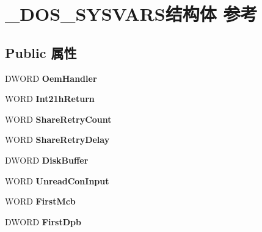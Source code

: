 \hypertarget{struct___d_o_s___s_y_s_v_a_r_s}{}\section{\+\_\+\+D\+O\+S\+\_\+\+S\+Y\+S\+V\+A\+R\+S结构体 参考}
\label{struct___d_o_s___s_y_s_v_a_r_s}
\subsection*{Public 属性}
\begin{DoxyCompactItemize}
\item 
\mbox{\label{struct___d_o_s___s_y_s_v_a_r_s_a5e091370267bb58497bc00f0b9d229a5}} 
D\+W\+O\+RD {\bfseries Oem\+Handler}
\item 
\mbox{\label{struct___d_o_s___s_y_s_v_a_r_s_a9132ecbda95510ffc3c15caf9d04359c}} 
W\+O\+RD {\bfseries Int21h\+Return}
\item 
\mbox{\label{struct___d_o_s___s_y_s_v_a_r_s_a7c52520cfef5e4665eab80ec16bb61e0}} 
W\+O\+RD {\bfseries Share\+Retry\+Count}
\item 
\mbox{\label{struct___d_o_s___s_y_s_v_a_r_s_a50db483b634f7fa4a9f90dedc065e945}} 
W\+O\+RD {\bfseries Share\+Retry\+Delay}
\item 
\mbox{\label{struct___d_o_s___s_y_s_v_a_r_s_aea3379153f52c2a35ca4cc2a82eef819}} 
D\+W\+O\+RD {\bfseries Disk\+Buffer}
\item 
\mbox{\label{struct___d_o_s___s_y_s_v_a_r_s_a0ede232087bc33abcdcbf36461db8070}} 
W\+O\+RD {\bfseries Unread\+Con\+Input}
\item 
\mbox{\label{struct___d_o_s___s_y_s_v_a_r_s_a26cc5ff885881379e1962ef8cd992ee1}} 
W\+O\+RD {\bfseries First\+Mcb}
\item 
\mbox{\label{struct___d_o_s___s_y_s_v_a_r_s_a056edb0db6346a92f58786fbf87af6fa}} 
D\+W\+O\+RD {\bfseries First\+Dpb}

\end{DoxyCompactItemize}
